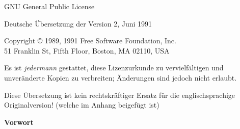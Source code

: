 
\begin{center}
{\large GNU General Public License}



Deutsche Übersetzung der Version 2, Juni 1991


{\sc Copyright © 1989, 1991 Free Software Foundation, Inc.\\
51 Franklin St, Fifth Floor, Boston, MA 02110, USA}
\end{center}

\vspace{0.75em}
Es ist {\sl jedermann} gestattet, diese Lizenzurkunde zu vervielfältigen und unveränderte Kopien zu verbreiten; Änderungen sind jedoch nicht erlaubt.


Diese Übersetzung ist kein rechtskräftiger Ersatz für die englischsprachige Originalversion! {\small (welche im Anhang beigefügt ist)}

\vspace{1em}

{\bf Vorwort}



